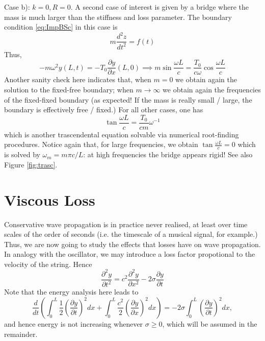 \medskip \medskip 
\noindent 
Case b): $k=0,R=0$. A second case of interest is given by a bridge where the mass is much larger than the stiffness and loss parameter. The boundary condition \eqref{eq:ImpBSc} in this case is
\begin{equation}
m \frac{d^2z}{dt^2} = f(t)
\end{equation}
Thus,
\begin{equation}
-m \omega^2 y(L,t) = -T_0 \frac{\partial y}{\partial x}(L,0) \implies m  \sin \frac{\omega L}{c} =   \frac{T_0}{c\omega} \cos \frac{\omega L}{c}
\end{equation}
Another sanity check here indicates that, when $m=0$ we obtain again the solution to the fixed-free boundary; when $m\rightarrow \infty$ we obtain again the frequencies of the fixed-fixed boundary (as expected! If the mass is really small / large, the boundary is effectively free / fixed.) For all other cases, one has
\begin{equation}\label{eq:bc2}
\tan \frac{\omega L}{c} = \frac{T_0}{c m}\omega^{-1}
\end{equation}
which is another trascendental equation solvable via numerical root-finding procedures. Notice again that, for large frequencies, we obtain  $\tan\frac{\omega L}{c}= 0$ which is solved by $\omega_m = m\pi c / L$: at high frequencies the bridge appears rigid! See also Figure \ref{fig:trasc}.


\section{Viscous Loss}


Conservative wave propagation is in practice never realised, at least over time scales of the order of seconds (i.e. the timescale of a musical signal, for example.) Thus, we are now going to study the effects that losses have on wave propagation. In analogy with the oscillator, we may introduce a loss factor propotional to the velocity of the string. Hence
\begin{equation}\label{eq:WEloss}
\frac{\partial^2 y}{\partial t^2} = c^2 \frac{\partial^2 y}{\partial x^2} - 2\sigma   \frac{\partial y}{\partial t}
\end{equation}
Note that the energy analysis here leads to
\begin{equation}\label{eq:EnBalWE}
\frac{d}{dt}\left( \int_{0}^{L} \frac{1}{2}\left( \frac{\partial y}{\partial t} \right)^2 dx + \int_{0}^{L} \frac{c^2}{2}\left( \frac{\partial y}{\partial x} \right)^2 dx \right) = -2\sigma \int_0^L \left(\frac{\partial y}{\partial t}\right)^2 dx,
\end{equation}
and hence energy is not increasing whenever $\sigma \geq 0$, which will be assumed in the remainder. 

